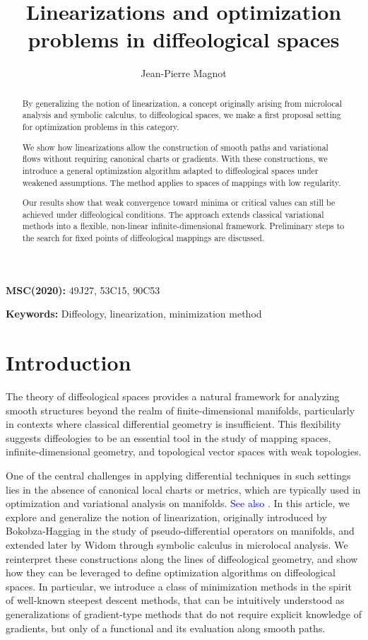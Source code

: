 \documentclass{amsart}
\title{Linearizations and optimization problems in diffeological spaces}
\author{Jean-Pierre Magnot}
\date{}
\newcommand{\minor}[1]{\textcolor{blue}{#1}}
\newcounter{thm}
\newcounter{ex}
\newcounter{re}
\begin{document}
\begin{abstract}
By generalizing the notion of linearization, a concept originally arising from microlocal analysis and symbolic calculus, to diffeological spaces, we make a first proposal setting for optimization problems in this category. 

We show how linearizations allow the construction of smooth paths and variational flows without requiring canonical charts or gradients. With these constructions, 
we introduce a general optimization algorithm adapted to diffeological spaces under weakened assumptions. The method applies to spaces of mappings with low regularity.

Our results show that weak convergence toward minima or critical values can still be achieved under diffeological conditions. The approach extends classical variational methods into a flexible, non-linear infinite-dimensional framework. Preliminary steps to the search for fixed points of diffeological mappings are discussed.
\end{abstract}
\maketitle
\textbf{MSC(2020):} 49J27, 53C15, 90C53

\textbf{Keywords:} Diffeology, linearization, minimization method

\section*{Introduction}

The theory of diffeological spaces provides a natural framework for analyzing smooth structures beyond the realm of finite-dimensional manifolds, particularly in contexts where classical differential geometry is insufficient. This flexibility suggests diffeologies to be an essential tool in the study of mapping spaces, infinite-dimensional geometry, and topological vector spaces with weak topologies.

One of the central challenges in applying differential techniques in such settings lies in the absence of canonical local charts or metrics, which are typically used in optimization and variational analysis on manifolds. \minor{See also \cite{Boumal2023,Absil2008}.} 
In this article, we explore and generalize the notion of linearization, originally introduced by Bokobza-Haggiag in the study of pseudo-differential operators on manifolds, and extended later by Widom through symbolic calculus in microlocal analysis. \minor{\cite{Wid}} \minor{\cite{BK}} We reinterpret these constructions along the lines of diffeological geometry, and show how they can be leveraged to define optimization algorithms on diffeological spaces. In particular, we introduce a class of minimization methods in the spirit of well-known steepest descent methods, that can be intuitively understood as generalizations of gradient-type methods that do not require explicit knowledge of gradients, but only of a functional and its evaluation along smooth paths.
\end{document}

